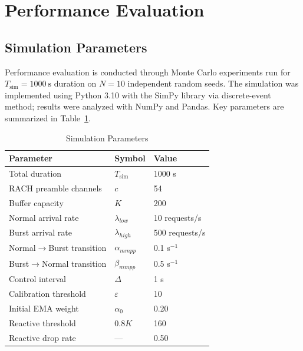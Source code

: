 \documentclass[conference]{IEEEtran}
\begin{document}
\section{Performance Evaluation}

\subsection{Simulation Parameters}

Performance evaluation is conducted through Monte Carlo experiments run for $T_{\mathrm{sim}} = 1000\ \mathrm{s}$ duration on $N = 10$ independent random seeds. The simulation was implemented using Python 3.10 with the SimPy library via discrete-event method; results were analyzed with NumPy and Pandas. Key parameters are summarized in Table~\ref{tab:params}.

\begin{table}[t]
\caption{Simulation Parameters}
\label{tab:params}
\begin{center}
\begin{tabular}{lll}
\toprule
\textbf{Parameter} & \textbf{Symbol} & \textbf{Value} \\
\midrule
Total duration              & $T_{\mathrm{sim}}$ & 1000 s \\
RACH preamble channels      & $c$                & 54 \\
Buffer capacity             & $K$                & 200 \\
Normal arrival rate         & $\lambda_{low}$    & 10 requests/s \\
Burst arrival rate          & $\lambda_{high}$   & 500 requests/s \\
Normal$\to$Burst transition & $\alpha_{mmpp}$    & 0.1 s$^{-1}$ \\
Burst$\to$Normal transition & $\beta_{mmpp}$     & 0.5 s$^{-1}$ \\
Control interval            & $\Delta$           & 1 s \\
Calibration threshold       & $\varepsilon$      & 10 \\
Initial EMA weight          & $\alpha_0$         & 0.20 \\
Reactive threshold          & $0.8K$             & 160 \\
Reactive drop rate          & ---                & 0.50 \\
\bottomrule
\end{tabular}
\end{center}
\end{table}
\end{document}

